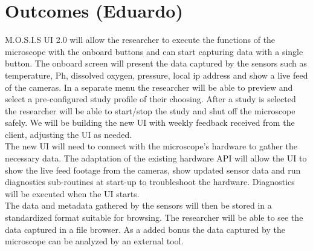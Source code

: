 \section{Outcomes (Eduardo)}
M.O.S.I.S UI 2.0 will allow the researcher to execute the functions of the microscope with the onboard buttons and can start capturing data with a single button. The onboard screen will present the data captured by the sensors such as temperature, Ph, dissolved oxygen, pressure, local ip address and show a live feed of the cameras. In a separate menu the researcher will be able to preview and select a pre-configured study profile of their choosing. After a study is selected the researcher will be able to start/stop the study and shut off the microscope safely. We will be building the new UI with weekly feedback received from the client, adjusting the UI as needed.\\
The new UI will need to connect with the microscope's hardware to gather the necessary data. The adaptation of the existing hardware API will allow the UI to show the live feed footage from the cameras, show updated sensor data and run diagnostics sub-routines at start-up to troubleshoot the hardware. Diagnostics will be executed when the UI starts.\\
The data and metadata gathered by the sensors will then be stored in a standardized format suitable for browsing. The researcher will be able to see the data captured in a file browser. As a added bonus the data captured by the microscope can be analyzed by an external tool. 